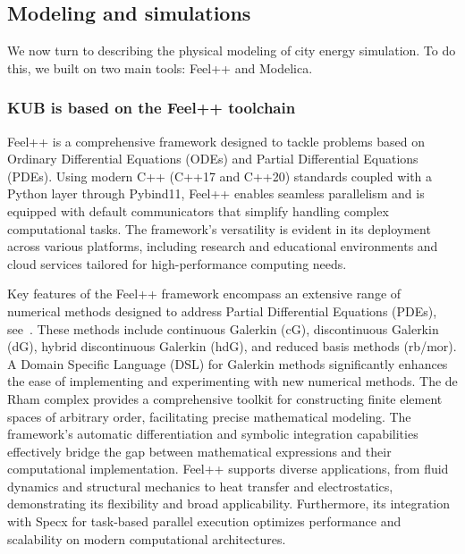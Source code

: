 \documentclass[runningheads]{llncs}
\begin{document}
\subsection{Modeling and simulations}

We now turn to describing the physical modeling of city energy simulation.
To do this, we built on two main tools: Feel++ and Modelica. 

\subsubsection{KUB is based on the Feel++ toolchain}

Feel++ is a comprehensive framework designed to tackle problems based on Ordinary Differential Equations (ODEs) and Partial Differential Equations (PDEs). Using modern C++ (C++17 and C++20) standards coupled with a Python layer through Pybind11, Feel++ enables seamless parallelism and is equipped with default communicators that simplify handling complex computational tasks. The framework's versatility is evident in its deployment across various platforms, including research and educational environments and cloud services tailored for high-performance computing needs.

Key features of the Feel++ framework encompass an extensive range of numerical methods designed to address Partial Differential Equations (PDEs), see~\cite{christophe_prudhomme_feelppfeelpp_2024}. These methods include continuous Galerkin (cG), discontinuous Galerkin (dG), hybrid discontinuous Galerkin (hdG), and reduced basis methods (rb/mor). A Domain Specific Language (DSL) for Galerkin methods significantly enhances the ease of implementing and experimenting with new numerical methods. The de Rham complex provides a comprehensive toolkit for constructing finite element spaces of arbitrary order, facilitating precise mathematical modeling. The framework's automatic differentiation and symbolic integration capabilities effectively bridge the gap between mathematical expressions and their computational implementation. Feel++ supports diverse applications, from fluid dynamics and structural mechanics to heat transfer and electrostatics, demonstrating its flexibility and broad applicability. Furthermore, its integration with Specx for task-based parallel execution optimizes performance and scalability on modern computational architectures.

\end{document}
